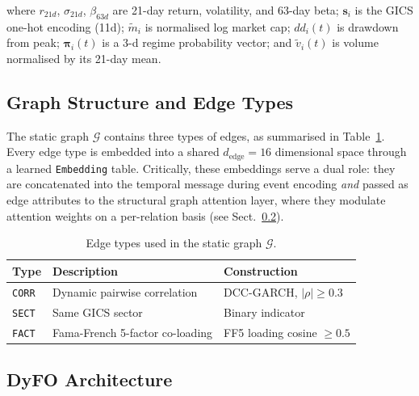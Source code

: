 \documentclass[runningheads]{llncs}
\begin{document}
where $r_{21d}$, $\sigma_{21d}$, $\beta_{63d}$ are 21-day return, volatility, and 63-day beta; $\mathbf{s}_i$ is the GICS one-hot encoding (11d); $\tilde{m}_i$ is normalised log market cap; $dd_i(t)$ is drawdown from peak; $\boldsymbol{\pi}_i(t)$ is a 3-d regime probability vector; and $\tilde{v}_i(t)$ is volume normalised by its 21-day mean.

\subsection{Graph Structure and Edge Types}\label{graph-structure-and-edge-types}

The static graph $\mathcal{G}$ contains three types of edges, as summarised in Table~\ref{tab:edge_types}. Every edge type is embedded into a shared $d_{\text{edge}} = 16$ dimensional space through a learned \texttt{Embedding} table. Critically, these embeddings serve a dual role: they are concatenated into the temporal message during event encoding \emph{and} passed as edge attributes to the structural graph attention layer, where they modulate attention weights on a per-relation basis (see Sect.~\ref{tgat-architecture-dyfo-next-day-variant-1}).

\begin{table}[ht]
\caption{Edge types used in the static graph $\mathcal{G}$.}
\label{tab:edge_types}
\centering
\begin{tabular}{|l|l|l|}
\hline
\textbf{Type} & \textbf{Description} & \textbf{Construction} \\
\hline
\texttt{CORR} & Dynamic pairwise correlation & DCC-GARCH, $|\rho| \geq 0.3$ \\
\texttt{SECT} & Same GICS sector & Binary indicator \\
\texttt{FACT} & Fama-French 5-factor co-loading & FF5 loading cosine $\geq 0.5$ \\
\hline
\end{tabular}
\end{table}

\subsection{DyFO Architecture}\label{tgat-architecture-dyfo-next-day-variant-1}
\end{document}
